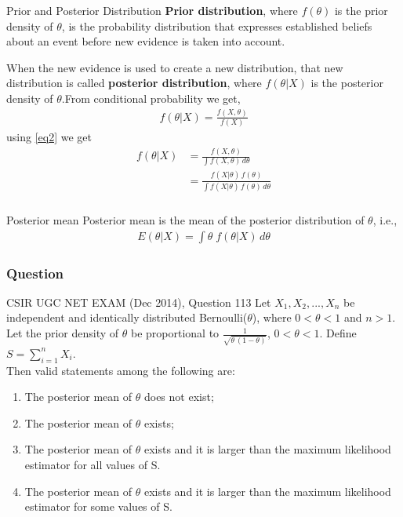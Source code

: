\documentclass{beamer}
\providecommand{\brak}[1]{\ensuremath{\left(#1\right)}}
\begin{document}
\begin{frame}
    \frametitle{}
    \begin{block}{Prior and Posterior Distribution}
     \textbf{Prior distribution}, where $f\brak{\theta}$ is the prior density of $\theta$, is the probability distribution that expresses established beliefs about an event before new evidence is taken into account. 
     
     When the new evidence is used to create a new distribution, that new distribution is called \textbf{posterior distribution}, where $f\brak{\theta|X}$ is the posterior density of $\theta$.From conditional probability we get,
     \begin{align}
             f\brak{\theta|X} = \frac{f\brak{X,\theta}}{f\brak{X}}
     \end{align}
     using \eqref{eq2} we get
     \begin{align}
         f\brak{\theta|X} &= \frac{f\brak{X,\theta}}{\int f\brak{X,\theta}\,d\theta}\\
         &= \frac{f\brak{X|\theta}\, f\brak{\theta}}{\int f\brak{X|\theta}\, f\brak{\theta}\,d\theta}\label{eq5}
     \end{align}
    \end{block}
\end{frame}

\begin{frame}
    \frametitle{}
    \begin{block}{Posterior mean}
      Posterior mean is the mean of the posterior distribution of $\theta$, i.e., 
        \begin{align}
            E\brak{\theta|X} = \int{\theta\;f\brak{\theta|X}\,d\theta}\label{eq6}
        \end{align}
    \end{block}
\end{frame}



\begin{frame}
    \frametitle{Question}
    \begin{block}{CSIR UGC NET EXAM (Dec 2014), Question 113}
    Let $X_1,X_2,...,X_n$ be independent and identically distributed Bernoulli($\theta$), where $0<\theta<1$ and $n>1$. Let the prior density of $\theta$ be proportional to $\frac{1}{\sqrt{\theta\,(1-\theta)}}$, $0<\theta<1$. Define $S=\sum_{i=1}^nX_i$.\\[1pt] Then valid statements among the following are:
    \begin{enumerate}
        \item The posterior mean of $\theta$ does not exist;
        \item The posterior mean of $\theta$ exists;
        \item The posterior mean of $\theta$ exists and it is larger than the maximum     likelihood estimator for all values of S.
        \item The posterior mean of $\theta$ exists and it is larger than the maximum     likelihood estimator for some values of S.
    \end{enumerate}
  \end{block}
\end{frame}
\end{document}
